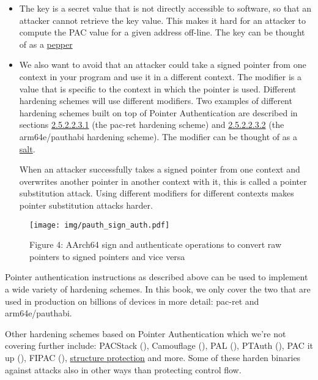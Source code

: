\documentclass[
  a4paper,
]{report}
\begin{document}
\begin{itemize}
\item
  The key is a secret value that is not directly accessible to software,
  so that an attacker cannot retrieve the key value. This makes it hard
  for an attacker to compute the PAC value for a given address off-line.
  The key can be thought of as a
  \href{https://en.wikipedia.org/wiki/Pepper_(cryptography)}{pepper}
\item
  We also want to avoid that an attacker could take a signed pointer
  from one context in your program and use it in a different context.
  The modifier is a value that is specific to the context in which the
  pointer is used. Different hardening schemes will use different
  modifiers. Two examples of different hardening schemes built on top of
  Pointer Authentication are described in sections
  \hyperref[sec:pac-ret]{2.5.2.2.3.1} (the pac-ret hardening scheme) and
  \hyperref[sec:arm64e-pauthabi]{2.5.2.2.3.2} (the arm64e/pauthabi
  hardening scheme). The modifier can be thought of as a
  \href{https://en.wikipedia.org/wiki/Salt_(cryptography)}{salt}.

  When an attacker successfully takes a signed pointer from one context
  and overwrites another pointer in another context with it, this is
  called a \label{__index_entry_54}{pointer substitution
  attack}. Using different modifiers
  for different contexts makes pointer substitution attacks harder.
\end{itemize}

\begin{figure}
\centering
\texttt{[image: img/pauth\_sign\_auth.pdf]}
\caption{Figure 4: AArch64 sign and authenticate operations to convert
raw pointers to signed pointers and vice
versa}\label{fig:pauth-sign-auth}
\end{figure}

Pointer authentication instructions as described above can be used to
implement a wide variety of hardening schemes. In this book, we only
cover the two that are used in production on billions of devices in more
detail: pac-ret and arm64e/pauthabi.

Other hardening schemes based on Pointer Authentication which we're not
covering further include: PACStack
(), Camouflage
(), PAL
(), PTAuth
(), PAC it up
(), FIPAC
(),
\href{https://discourse.llvm.org/t/rfc-structure-protection-a-family-of-uaf-mitigation-techniques/85555}{structure
protection} and more. Some of these harden binaries against attacks also
in other ways than protecting control flow.
\end{document}
